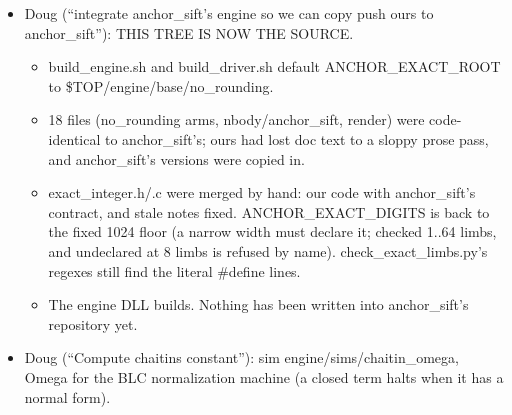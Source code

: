 \begin{enumerate}
\begin{itemize}
\begin{itemize}
\begin{itemize}
\item Wired through engine\_\allowbreak{}config.h, keymath imprint (bits: quotient = left, remainder = min, gcd = max), key\_\allowbreak{}schedule refs, cycle.c (host, the library itself) and cycle.cu (device Knuth D, Euclid, and multiply-and-mask on the register arrays).
\item The kernel is templated <WIDE, DIVIDES>: only a dividing program carries 5·WIDE+4 limbs of scratch.
\item test/engine/record\_\allowbreak{}divide\_\allowbreak{}test passes 15/0: device = host word for word in the 64- and 256-limb files, with identities, exact factors, refusals and imprint order. record\_\allowbreak{}table\_\allowbreak{}test still passes.
\end{itemize}
\item Doug (“integrate anchor\_\allowbreak{}sift's engine so we can copy push ours to anchor\_\allowbreak{}sift”): THIS TREE IS NOW THE SOURCE.

\begin{itemize}
\item build\_\allowbreak{}engine.sh and build\_\allowbreak{}driver.sh default ANCHOR\_\allowbreak{}EXACT\_\allowbreak{}ROOT to \$TOP/engine/base/no\_\allowbreak{}rounding.
\item 18 files (no\_\allowbreak{}rounding arms, nbody/anchor\_\allowbreak{}sift, render) were code-identical to anchor\_\allowbreak{}sift's; ours had lost doc text to a sloppy prose pass, and anchor\_\allowbreak{}sift's versions were copied in.
\item exact\_\allowbreak{}integer.h/.c were merged by hand: our code with anchor\_\allowbreak{}sift's contract, and stale notes fixed. ANCHOR\_\allowbreak{}EXACT\_\allowbreak{}DIGITS is back to the fixed 1024 floor (a narrow width must declare it; checked 1..64 limbs, and undeclared at 8 limbs is refused by name). check\_\allowbreak{}exact\_\allowbreak{}limbs.py's regexes still find the literal \#define lines.
\item The engine DLL builds. Nothing has been written into anchor\_\allowbreak{}sift's repository yet.
\end{itemize}
\item Doug (“Compute chaitins constant”): sim engine/sims/chaitin\_\allowbreak{}omega, Omega for the BLC normalization machine (a closed term halts when it has a normal form).


\end{itemize}
\end{itemize}
\end{enumerate}

